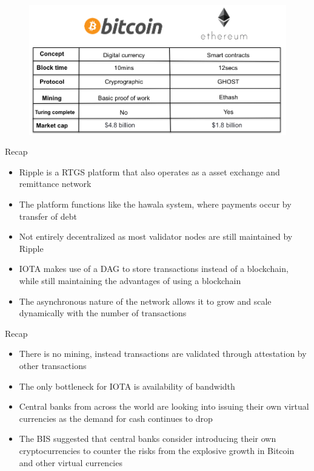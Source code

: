 \documentclass[11pt]{beamer}
\begin{document}

\begin{frame}
	\begin{figure}[]
		\centering
		\includegraphics  [scale=0.25]{Images/btcvseth}
	\end{figure}
\end{frame}


\begin{frame}{Recap}
	\begin{itemize}
		\item Ripple is a RTGS platform that also operates as a asset exchange and remittance network
		\item The platform functions like the hawala system, where payments occur by transfer of debt
		\item Not entirely decentralized as most validator nodes are still maintained by Ripple
		\item IOTA makes use of a DAG to store transactions instead of a blockchain, while still maintaining the advantages of using a blockchain
		\item The asynchronous nature of the network allows it to grow and scale dynamically with the number of transactions
	\end{itemize}
\end{frame}


\begin{frame}{Recap}
	\begin{itemize}
		\item There is no mining, instead transactions are validated through attestation by other transactions
		\item The only bottleneck for IOTA is availability of bandwidth
		\item Central banks from across the world are looking into issuing their own virtual currencies as the demand for cash continues to drop
		\item The BIS suggested that central banks consider introducing their own cryptocurrencies to counter the risks from the explosive growth in Bitcoin and other virtual currencies
	\end{itemize}
\end{frame}
\end{document}
